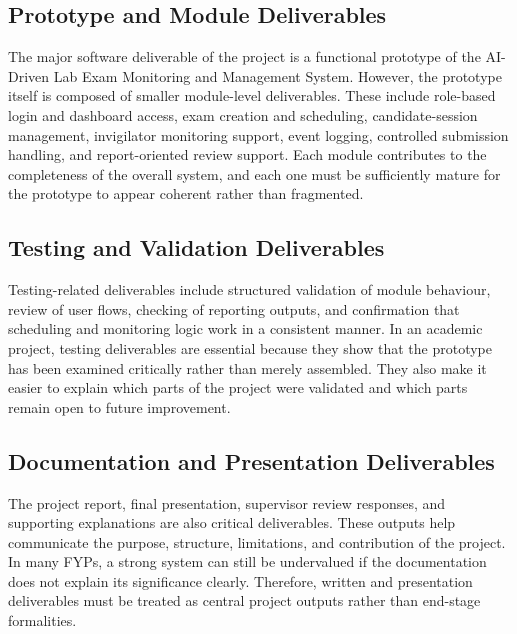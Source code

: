 \subsection{Prototype and Module Deliverables}

The major software deliverable of the project is a functional prototype of the AI-Driven Lab Exam Monitoring and Management System. However, the prototype itself is composed of smaller module-level deliverables. These include role-based login and dashboard access, exam creation and scheduling, candidate-session management, invigilator monitoring support, event logging, controlled submission handling, and report-oriented review support. Each module contributes to the completeness of the overall system, and each one must be sufficiently mature for the prototype to appear coherent rather than fragmented.

\subsection{Testing and Validation Deliverables}

Testing-related deliverables include structured validation of module behaviour, review of user flows, checking of reporting outputs, and confirmation that scheduling and monitoring logic work in a consistent manner. In an academic project, testing deliverables are essential because they show that the prototype has been examined critically rather than merely assembled. They also make it easier to explain which parts of the project were validated and which parts remain open to future improvement.

\subsection{Documentation and Presentation Deliverables}

The project report, final presentation, supervisor review responses, and supporting explanations are also critical deliverables. These outputs help communicate the purpose, structure, limitations, and contribution of the project. In many FYPs, a strong system can still be undervalued if the documentation does not explain its significance clearly. Therefore, written and presentation deliverables must be treated as central project outputs rather than end-stage formalities.

